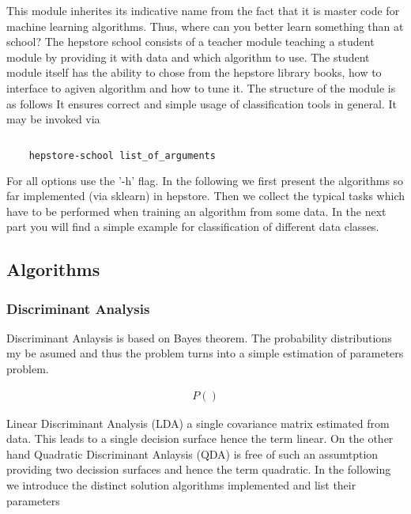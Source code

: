 This module inherites its indicative name from the fact that it is
master code for machine learning algorithms. Thus, where can you
better learn something than at school? The hepstore school consists of
a teacher module teaching a student module by providing it with data
and which algorithm to use. The student module itself has the ability
to chose from the hepstore library books, how to interface to agiven
algorithm and how to tune it. The structure of the module is as
follows
%
\hspace*{0.5cm}
\hspace*{0.5cm}
%
It ensures correct and simple usage of classification tools in
general. It may be invoked via
%
\begin{changemargin}{1.5cm}{1.5cm}
  \centering
  \begin{lstlisting}[language=Bash]
    
    hepstore-school list_of_arguments
  \end{lstlisting}
\end{changemargin}
%
For all options use the '-h' flag. In the following we first present
the algorithms so far implemented (via sklearn) in hepstore. Then we
collect the typical tasks which have to be performed when training an
algorithm from some data. In the next part you will find a simple
example for classification of different data classes.

\subsection{Algorithms}

\subsubsection{Discriminant Analysis}
Discriminant Anlaysis is based on Bayes theorem. The probability
distributions my be asumed and thus the problem turns into a simple
estimation of parameters problem.
%
\begin{ceqn}
  \begin{align}
    P()
    \label{eq:}
  \end{align}
\end{ceqn}
%
Linear Discriminant Analysis (LDA) a single covariance matrix
estimated from data. This leads to a single decision surface hence the
term linear. On the other hand Quadratic Discriminant Anlaysis (QDA)
is free of such an assumtption providing two decission surfaces and
hence the term quadratic. In the following we introduce the distinct
solution algorithms implemented and list their parameters

